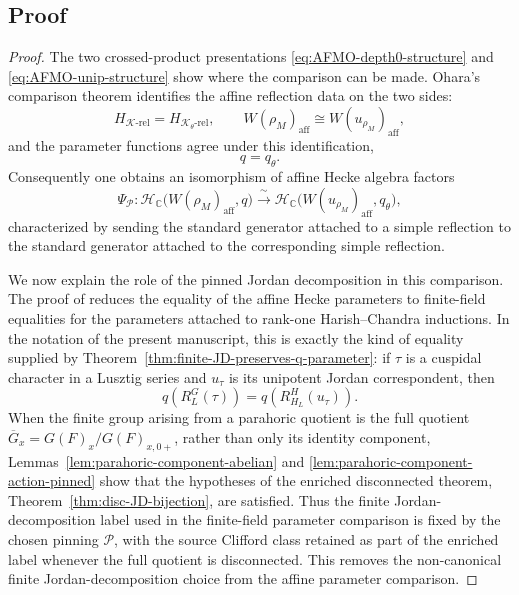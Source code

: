 \documentclass{amsart}
\theoremstyle{plain}
\numberwithin{equation}{section}
\theoremstyle{definition}
\newcommand{\cP}{\mathcal{P}}
\newcommand{\cH}{\mathcal{H}}
\newcommand{\C}{\mathbb{C}}
\begin{document}
\subsection{Proof}
\begin{proof}
The two crossed-product presentations \eqref{eq:AFMO-depth0-structure} and
\eqref{eq:AFMO-unip-structure} show where the comparison can be made.  Ohara's
comparison theorem \cite[Theorem~4.4.1]{ohara2025} identifies the affine
reflection data on the two sides:
\[
        H_{\mathcal K\text{-rel}}=H_{\mathcal K_\theta\text{-rel}},
        \qquad
        W(\rho_M)_{\mathrm{aff}}
        \cong
        W(u_{\rho_M})_{\mathrm{aff}},
\]
and the parameter functions agree under this identification,
\[
        q=q_\theta .
\]
Consequently one obtains an isomorphism of affine Hecke algebra factors
\begin{equation}\label{eq:aff-hecke-iso}
\Psi_{\cP}:
\cH_{\C}\!\bigl(W(\rho_M)_{\mathrm{aff}},q\bigr)
\xrightarrow{\ \sim\ }
\cH_{\C}\!\bigl(W(u_{\rho_M})_{\mathrm{aff}},q_\theta\bigr),
\end{equation}
characterized by sending the standard generator attached to a simple reflection
to the standard generator attached to the corresponding simple reflection.

We now explain the role of the pinned Jordan decomposition in this comparison.
The proof of \cite[Theorem~4.4.1]{ohara2025} reduces the equality of the affine
Hecke parameters to finite-field equalities for the parameters attached to
rank-one Harish--Chandra inductions.  In the notation of the present manuscript,
this is exactly the kind of equality supplied by
Theorem~\ref{thm:finite-JD-preserves-q-parameter}: if \(\tau\) is a cuspidal
character in a Lusztig series and \(u_\tau\) is its unipotent Jordan correspondent,
then
\[
q\!\left(R_L^G(\tau)\right)
=
q\!\left(R_{H_L}^{H}(u_\tau)\right).
\]
When the finite group arising from a parahoric quotient is the full quotient
\(\overline G_x=G(F)_x/G(F)_{x,0+}\), rather than only its identity component,
Lemmas~\ref{lem:parahoric-component-abelian} and
\ref{lem:parahoric-component-action-pinned} show that the hypotheses of the
enriched disconnected theorem, Theorem~\ref{thm:disc-JD-bijection}, are satisfied.
Thus the finite Jordan-decomposition label used in the finite-field parameter
comparison is fixed by the chosen pinning \(\cP\), with the source Clifford class
retained as part of the enriched label whenever the full quotient is disconnected.
This removes the non-canonical finite Jordan-decomposition choice from the affine
parameter comparison.


\end{proof}
\end{document}
